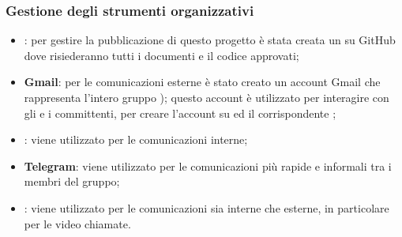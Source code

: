 \subsubsection{Gestione degli strumenti organizzativi}
\begin{itemize}
	\item \textbf{}: per gestire la pubblicazione di questo progetto è stata creata un  su GitHub dove risiederanno tutti i documenti e il codice approvati;
	\item \textbf{Gmail}: per le comunicazioni esterne è stato creato un account Gmail che rappresenta l’intero gruppo \Mail{}); questo account è utilizzato per interagire con gli
 e i committenti, per creare l’account su  ed il corrispondente ;
	\item \textbf{}: viene utilizzato per le comunicazioni interne;
	\item \textbf{Telegram}: viene utilizzato per le comunicazioni più rapide e informali tra i membri del
gruppo;
	\item \textbf{}: viene utilizzato per le comunicazioni sia interne che esterne, in particolare per le video chiamate.
\end{itemize}
